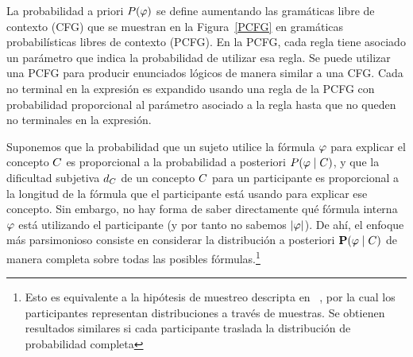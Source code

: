 La probabilidad a priori $P(\varphi)$ se define aumentando las gramáticas libre de contexto (CFG) que se muestran en la Figura~\ref{PCFG} en gramáticas probabilísticas libres de contexto (PCFG). En la PCFG, cada regla tiene asociado un parámetro que indica la probabilidad de utilizar esa regla. Se puede utilizar una PCFG para producir enunciados lógicos de manera similar a una CFG. Cada no terminal en la expresión es expandido usando una regla de la PCFG con probabilidad proporcional al parámetro asociado a la regla hasta que no queden no terminales en la expresión. 


Suponemos que la probabilidad que un sujeto utilice la fórmula $\varphi$ para explicar el concepto $C$ es proporcional a la probabilidad a posteriori $P(\varphi \mid C)$, y que la dificultad subjetiva $d_C$ de un concepto $C$ para un participante es proporcional a la longitud de la fórmula que el participante está usando para explicar ese concepto. Sin embargo, no hay forma de saber directamente qué fórmula interna $\varphi$ está utilizando el participante (y por tanto no sabemos $|\varphi|$). De ahí, el enfoque más parsimonioso consiste en considerar la distribución a posteriori $\textbf{P}(\varphi \mid C)$ de manera completa sobre todas las posibles fórmulas.\footnote{Esto es equivalente a la hipótesis de muestreo descripta en ~\cite{denison2013rational}, por la cual los participantes representan distribuciones a través de muestras. Se obtienen resultados similares si cada participante traslada la distribución de probabilidad completa} 

